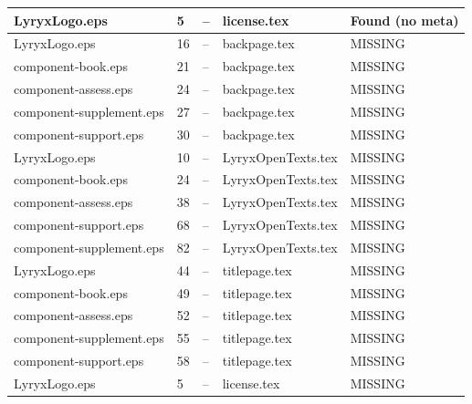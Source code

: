 \documentclass[11pt]{article}
\begin{document}
\begin{longtable}{|p{3.5cm}|p{1.5cm}|p{1cm}|p{4cm}|p{2cm}|}
LyryxLogo.eps & 5 & -- & license.tex & \textcolor{warning}{Found (no meta)} \\
\hline

LyryxLogo.eps & 16 & -- & backpage.tex & \textcolor{missing}{MISSING} \\
\hline

component-book.eps & 21 & -- & backpage.tex & \textcolor{missing}{MISSING} \\
\hline

component-assess.eps & 24 & -- & backpage.tex & \textcolor{missing}{MISSING} \\
\hline

component-supplement.eps & 27 & -- & backpage.tex & \textcolor{missing}{MISSING} \\
\hline

component-support.eps & 30 & -- & backpage.tex & \textcolor{missing}{MISSING} \\
\hline

LyryxLogo.eps & 10 & -- & LyryxOpenTexts.tex & \textcolor{missing}{MISSING} \\
\hline

component-book.eps & 24 & -- & LyryxOpenTexts.tex & \textcolor{missing}{MISSING} \\
\hline

component-assess.eps & 38 & -- & LyryxOpenTexts.tex & \textcolor{missing}{MISSING} \\
\hline

component-support.eps & 68 & -- & LyryxOpenTexts.tex & \textcolor{missing}{MISSING} \\
\hline

component-supplement.eps & 82 & -- & LyryxOpenTexts.tex & \textcolor{missing}{MISSING} \\
\hline

LyryxLogo.eps & 44 & -- & titlepage.tex & \textcolor{missing}{MISSING} \\
\hline

component-book.eps & 49 & -- & titlepage.tex & \textcolor{missing}{MISSING} \\
\hline

component-assess.eps & 52 & -- & titlepage.tex & \textcolor{missing}{MISSING} \\
\hline

component-supplement.eps & 55 & -- & titlepage.tex & \textcolor{missing}{MISSING} \\
\hline

component-support.eps & 58 & -- & titlepage.tex & \textcolor{missing}{MISSING} \\
\hline

LyryxLogo.eps & 5 & -- & license.tex & \textcolor{missing}{MISSING} \\
\hline

\end{longtable}
\end{document}
